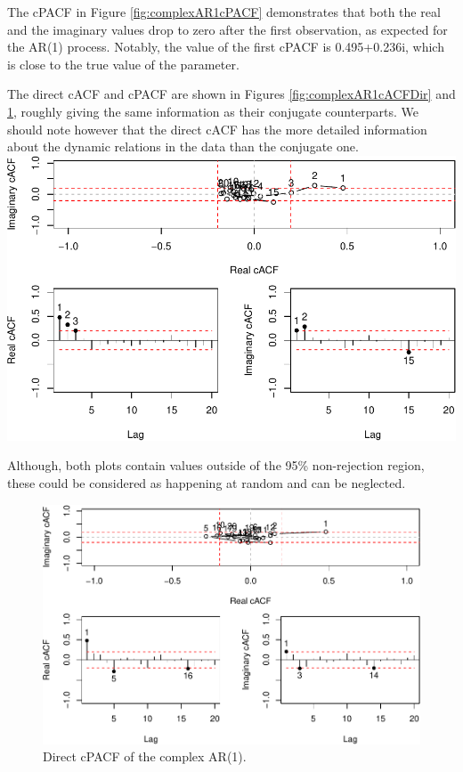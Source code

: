 \documentclass[
]{book}
\begin{document}
The cPACF in Figure \ref{fig:complexAR1cPACF} demonstrates that both the real and the imaginary values drop to zero after the first observation, as expected for the AR(1) process. Notably, the value of the first cPACF is 0.495+0.236i, which is close to the true value of the parameter.

The direct cACF and cPACF are shown in Figures \ref{fig:complexAR1cACFDir} and \ref{fig:complexAR1cpACFDir}, roughly giving the same information as their conjugate counterparts. We should note however that the direct cACF has the more detailed information about the dynamic relations in the data than the conjugate one.
\includegraphics{Svetunkov---Svetunkov---Complex-Valued-Econometrics_files/figure-latex/complexAR1cACFDir-1.pdf}

Although, both plots contain values outside of the 95\% non-rejection region, these could be considered as happening at random and can be neglected.

\begin{figure}
\centering
\includegraphics{Svetunkov---Svetunkov---Complex-Valued-Econometrics_files/figure-latex/complexAR1cpACFDir-1.pdf}
\caption{\label{fig:complexAR1cpACFDir}Direct cPACF of the complex AR(1).}
\end{figure}
\end{document}
